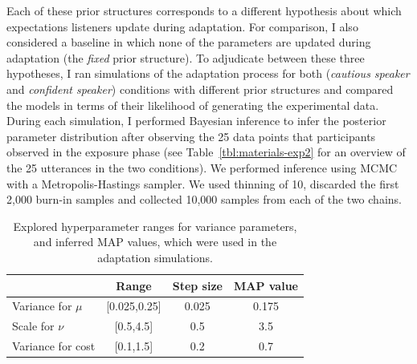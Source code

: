 Each of these prior structures corresponds to a different hypothesis about which expectations listeners update during adaptation. For comparison, I also considered a baseline in which none of the parameters are updated during adaptation (the {\it fixed} prior structure). To adjudicate between these three hypotheses, I ran simulations of the adaptation process for both (\textit{cautious speaker} and \textit{confident speaker}) conditions with different prior structures and compared the models in terms of their likelihood of generating the experimental data. During each simulation, I performed Bayesian inference to infer the posterior parameter distribution after observing the 25 data points that participants observed in the exposure phase (see Table~\ref{tbl:materials-exp2} for an overview of the 25 utterances in the two conditions). We performed inference using MCMC with a Metropolis-Hastings sampler. We used thinning of 10, discarded the first 2,000 burn-in samples and collected 10,000 samples from each of the two chains.

\begin{table}
\center
\begin{tabular}{l | c | c | c  }
 & Range &  Step size & MAP value  \\ \midrule
Variance for $\mu$ & [0.025,0.25] & 0.025 & 0.175  \\
Scale for $\nu$  & [0.5,4.5]  & 0.5   & 3.5  \\
Variance for cost & [0.1,1.5] & 0.2 & 0.7  \\
\end{tabular}
\caption{Explored hyperparameter ranges for variance parameters, and inferred MAP values, which were used in the adaptation simulations.  \label{tbl:hyperparams}}
\end{table}


